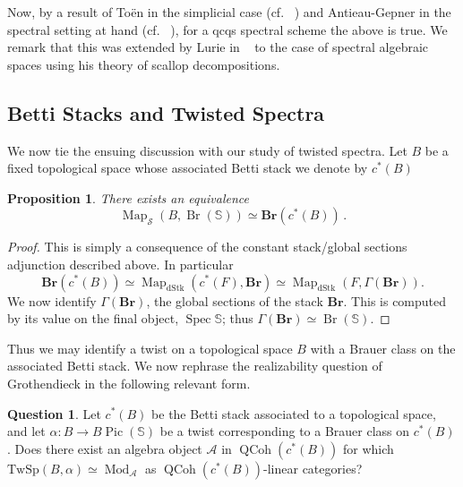 \documentclass[10pt]{amsart}
\theoremstyle{plain}
\newtheorem{proposition}[theorem]{Proposition}
\theoremstyle{definition}
\newtheorem{question}[theorem]{Question}
\DeclareMathOperator{\Mod}{Mod}
\DeclareMathOperator{\Pic}{Pic}
\DeclareMathOperator{\Br}{Br}
\def\on{\operatorname}
\DeclareMathOperator{\Map}{Map}
\newcommand{\bS}{\mathbb{S}}
\newcommand{\TwSp}{\mathrm{TwSp}}
\newcommand{\cA}{\mathcal{A}}
\newcommand{\cS}{\mathcal{S}}
\begin{document}
Now, by a result of To\"{e}n in the simplicial case (cf. ~\cite[Theorem 3.7]{derivedaz}) and Antieau-Gepner in the spectral setting at hand (cf. ~\cite[Theorem 6.1]{AG14}), for a qcqs spectral scheme the above is true. We remark that this was extended by Lurie  in ~\cite{SAG} to the case of spectral algebraic spaces using his theory of scallop decompositions.

\subsection{Betti Stacks and Twisted Spectra}
We now tie the ensuing discussion with our study of twisted spectra. Let $B$ be a fixed topological space whose associated Betti stack we denote by  $c^*(B)$

\begin{proposition}
    There exists an equivalence
    \[
    \Map_{\cS}(B, \Br(\bS)) \simeq \mathbf{Br}(c^*(B)) \,.
    \]
\end{proposition}

\begin{proof}
    This is simply a consequence of the constant stack/global sections adjunction described above. In particular
    $$
    \mathbf{Br}(c^*(B)) \simeq \Map_{\on{dStk}}(c^*(F), \mathbf{Br}) \simeq \Map_{\on{dStk}}(F, \Gamma(\mathbf{Br})).
    $$
We now identify $\Gamma(\mathbf{Br})$, the global sections of the stack $\mathbf{Br}$. This is computed by its value on the final object, $\on{Spec} \bS$; thus  $\Gamma(\mathbf{Br}) \simeq \Br(\bS)$.
\end{proof}

Thus we may identify a twist on a topological space $B$ with a Brauer class on the associated Betti stack. We now rephrase the realizability question of Grothendieck in the following relevant form.

\begin{question}
Let $c^*(B)$ be the Betti stack associated to a topological space, and let $\alpha : B \to B \Pic(\bS)$ be a twist corresponding to a Brauer class on $c^*(B)$. Does there exist an algebra object $\cA$ in $\on{QCoh}(c^*(B))$ for which $\TwSp(B, \alpha) \simeq \Mod_{\cA}$ as $\on{QCoh}(c^*(B))$-linear categories?
\end{question}
\end{document}

